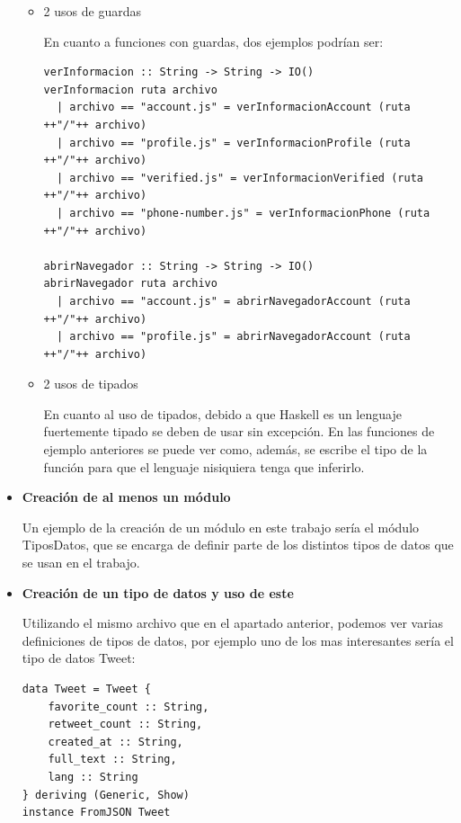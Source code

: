 \documentclass[11pt]{article}
\begin{document}
\begin{itemize}
\begin{itemize}
        \medskip
        \item 2 usos de guardas
        
        En cuanto a funciones con guardas, dos ejemplos podrían ser:
        
        \begin{verbatim}
verInformacion :: String -> String -> IO()
verInformacion ruta archivo
  | archivo == "account.js" = verInformacionAccount (ruta ++"/"++ archivo)
  | archivo == "profile.js" = verInformacionProfile (ruta ++"/"++ archivo)
  | archivo == "verified.js" = verInformacionVerified (ruta ++"/"++ archivo)
  | archivo == "phone-number.js" = verInformacionPhone (ruta ++"/"++ archivo)
  
abrirNavegador :: String -> String -> IO()
abrirNavegador ruta archivo
  | archivo == "account.js" = abrirNavegadorAccount (ruta ++"/"++ archivo)
  | archivo == "profile.js" = abrirNavegadorAccount (ruta ++"/"++ archivo)
            \end{verbatim}
        
        \item 2 usos de tipados
        
        En cuanto al uso de tipados, debido a que Haskell es un lenguaje fuertemente tipado se deben de usar sin excepción. En las funciones de ejemplo anteriores se puede ver como, además, se escribe el tipo de la función para que el lenguaje nisiquiera tenga que inferirlo.
        
        
    \end{itemize}
    
    \item \textbf{Creación de al menos un módulo}
    
    Un ejemplo de la creación de un módulo en este trabajo sería el módulo TiposDatos, que se encarga de definir parte de los distintos tipos de datos que se usan en el trabajo.
    
    \item \textbf{Creación de un tipo de datos y uso de este}
    
    Utilizando el mismo archivo que en el apartado anterior, podemos ver varias definiciones de tipos de datos, por ejemplo uno de los mas interesantes sería el tipo de datos Tweet:
    
        \begin{verbatim}
data Tweet = Tweet {
    favorite_count :: String,
    retweet_count :: String,
    created_at :: String,
    full_text :: String,
    lang :: String
} deriving (Generic, Show)
instance FromJSON Tweet
\end{verbatim}
        

\end{itemize}
\end{document}
